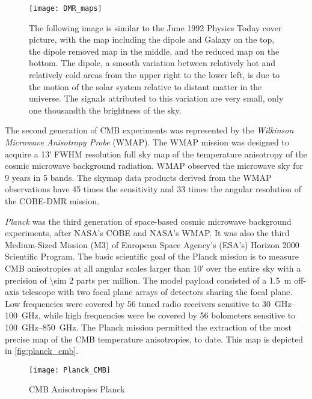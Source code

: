 \begin{figure}
        \centering
        \texttt{[image: DMR\_maps]}
        \caption{The following image is similar to the June 1992 Physics
        Today cover picture, with the map including the dipole and Galaxy
        on the top, the dipole removed map in the middle, and the reduced
        map on the bottom. The dipole, a smooth variation between
        relatively hot and relatively cold areas from the upper right to
        the lower left, is due to the motion of the solar system relative
        to distant matter in the universe. The signals attributed to this
        variation are very small, only one thousandth the brightness of the
        sky.}
        \label{fig:dmr_maps}
\end{figure}

The second generation of CMB experiments was represented by the
\emph{Wilkinson Microwave Anisotropy Probe} (WMAP). The WMAP mission was
designed to acquire a \ang{;13;} FWHM resolution full sky
map of the temperature anisotropy of the cosmic microwave background
radiation. WMAP observed the microwave sky for \num{9} years in \num{5}
bands. The skymap data products derived from the WMAP observations have
\num{45} times the sensitivity and \num{33} times the angular resolution
of the COBE-DMR mission.

\emph{Planck} was the third generation of space-based cosmic microwave background
experiments, after NASA's COBE and NASA's WMAP. It was also the third
Medium-Sized Mission (M3) of European Space Agency's (ESA's) Horizon 2000
Scientific Program. The basic scientific goal of the Planck mission is to
measure CMB anisotropies at all angular scales larger than \ang{;10;}
over the entire sky with a precision of \num{\sim 2} parts per million.
The model payload consisted of a \SI{1.5}{\meter} off-axis telescope with
two focal plane arrays of detectors sharing the focal plane. Low frequencies
were covered by \num{56} tuned radio receivers sensitive to
\SIrange{30}{100}{\giga\hertz}, while high frequencies were be covered by
\num{56} bolometers sensitive to \SIrange{100}{850}{\giga\hertz}.
The Planck mission permitted the extraction of the most precise map of the
CMB temperature anisotropies, to date. This map is depicted in
\autoref{fig:planck_cmb}.

\begin{figure}
        \centering
        \texttt{[image: Planck\_CMB]}
        \caption{CMB Anisotropies Planck}
        \label{fig:planck_cmb}
\end{figure}

